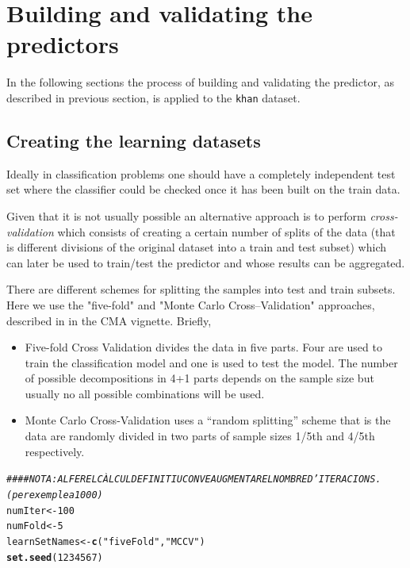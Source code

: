 \documentclass{article}\usepackage[]{graphicx}\usepackage[]{color}
\makeatletter
\newcommand{\hlnum}[1]{\textcolor[rgb]{0.686,0.059,0.569}{#1}}%
\newcommand{\hlstr}[1]{\textcolor[rgb]{0.192,0.494,0.8}{#1}}%
\newcommand{\hlcom}[1]{\textcolor[rgb]{0.678,0.584,0.686}{\textit{#1}}}%
\newcommand{\hlstd}[1]{\textcolor[rgb]{0.345,0.345,0.345}{#1}}%
\newcommand{\hlkwb}[1]{\textcolor[rgb]{0.69,0.353,0.396}{#1}}%
\newcommand{\hlkwd}[1]{\textcolor[rgb]{0.737,0.353,0.396}{\textbf{#1}}}%
\newenvironment{kframe}{%
 \def\at@end@of@kframe{}%
 \ifinner\ifhmode%
  \def\at@end@of@kframe{\end{minipage}}%
  \begin{minipage}{\columnwidth}%
 \fi\fi%
 \def\FrameCommand##1{\hskip\@totalleftmargin \hskip-\fboxsep
 \colorbox{shadecolor}{##1}\hskip-\fboxsep
     \hskip-\linewidth \hskip-\@totalleftmargin \hskip\columnwidth}%
 \MakeFramed {\advance\hsize-\width
   \@totalleftmargin\z@ \linewidth\hsize
   \@setminipage}}%
 {\par\unskip\endMakeFramed%
 \at@end@of@kframe}
\newenvironment{knitrout}{}{} %
\makeatother
\begin{document}
\section{Building and validating the predictors}

In the following sections the process of building and validating the predictor, as described in previous section, is applied to the \texttt{khan} dataset.




\subsection{Creating the learning datasets}

Ideally in classification problems one should have a completely independent test set where the classifier could be checked once it has been built on the train data. 

Given that it is not usually possible an alternative approach is to perform \emph{cross-validation} which consists of creating a certain number of splits of the data (that is different divisions of the original dataset into a train and test subset) which can later be used to train/test the predictor and whose results can be aggregated.

There are different schemes for splitting the samples into test and train subsets. Here we use  the "five-fold" and "Monte Carlo Cross--Validation" approaches, described in in the CMA vignette. Briefly,
\begin{itemize}
  \item Five-fold Cross Validation divides the data in five parts. Four are used to train the classification model and one is used to test the model. The number of possible decompositions in 4+1 parts depends on the sample size but usually no all possible combinations will be used.
  \item Monte Carlo Cross-Validation uses a ``random splitting'' scheme that is the data are randomly divided in two parts of sample sizes 1/5th and 4/5th respectively.
\end{itemize}

\begin{knitrout}
\color{fgcolor}\begin{kframe}
\begin{alltt}
\hlcom{#### NOTA: AL FER EL CÀLCUL DEFINITIU CONVE AUGMENTAR EL NOMBRE D'ITERACIONS. (per exemple a 1000)}
\hlstd{numIter} \hlkwb{<-} \hlnum{100}
\hlstd{numFold} \hlkwb{<-} \hlnum{5}
\hlstd{learnSetNames} \hlkwb{<-} \hlkwd{c}\hlstd{(}\hlstr{"fiveFold"}\hlstd{,} \hlstr{"MCCV"}\hlstd{)}
\hlkwd{set.seed}\hlstd{(}\hlnum{1234567}\hlstd{)}
\end{alltt}
\end{kframe}
\end{knitrout}
\end{document}
